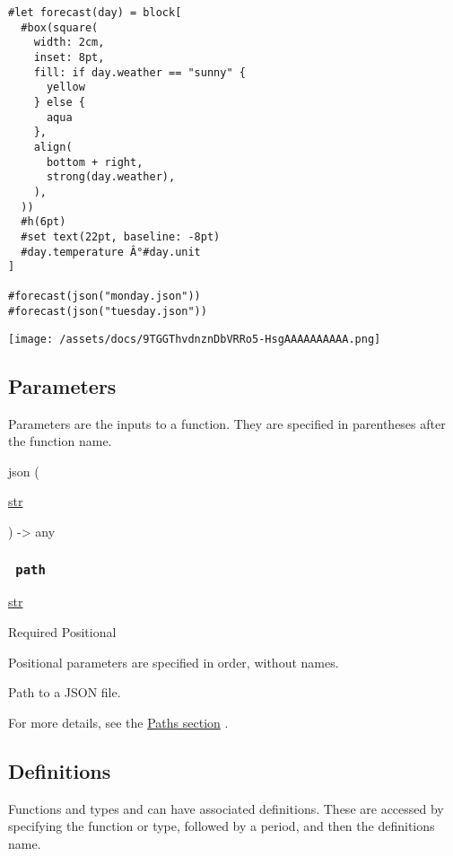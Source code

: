 \begin{verbatim}
#let forecast(day) = block[
  #box(square(
    width: 2cm,
    inset: 8pt,
    fill: if day.weather == "sunny" {
      yellow
    } else {
      aqua
    },
    align(
      bottom + right,
      strong(day.weather),
    ),
  ))
  #h(6pt)
  #set text(22pt, baseline: -8pt)
  #day.temperature Â°#day.unit
]

#forecast(json("monday.json"))
#forecast(json("tuesday.json"))
\end{verbatim}

\texttt{[image: /assets/docs/9TGGThvdnznDbVRRo5-HsgAAAAAAAAAA.png]}

\subsection{\texorpdfstring{{ Parameters
}}{ Parameters }}\label{parameters}

\label{parameters-tooltip}
Parameters are the inputs to a function. They are specified in
parentheses after the function name.

{ json } (

{ \href{/docs/reference/foundations/str/}{str} }

) -\textgreater{} { any }

\subsubsection{\texorpdfstring{\texttt{\ path\ }}{ path }}\label{parameters-path}

\href{/docs/reference/foundations/str/}{str}

{Required} {{ Positional }}

\label{parameters-path-positional-tooltip}
Positional parameters are specified in order, without names.

Path to a JSON file.

For more details, see the \href{/docs/reference/syntax/\#paths}{Paths
section} .

\subsection{\texorpdfstring{{ Definitions
}}{ Definitions }}\label{definitions}

\label{definitions-tooltip}
Functions and types and can have associated definitions. These are
accessed by specifying the function or type, followed by a period, and
then the definition\textquotesingle s name.

